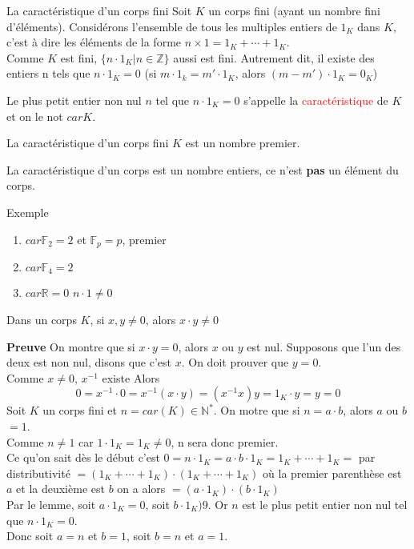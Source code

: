 \begin{parag}{La caractéristique d'un corps fini}
    Soit $K$ un corps fini (ayant un nombre fini d'éléments). Considérons l'ensemble de tous les multiples entiers de $1_K$ dans $K$, c'est à dire les éléments de la forme $n \times 1 = 1_K + \cdots + 1_K$.\\
    Comme $K$ est fini, $\{n\cdot 1_K| n \in \mathbb{Z}\}$ aussi est fini. Autrement dit, il existe des entiers n tels que $n \cdot 1_K = 0$ (si $m \cdot 1_k = m'\cdot 1_K$, alors $(m-m')\cdot 1_K = 0_K$)
    \begin{definition}
        Le plus petit entier non nul $n$ tel que $n\cdot 1_K = 0$ s'appelle la \textcolor{red}{caractéristique} de $K$ et on le not $carK$.
    \end{definition}
    \begin{theoreme}
        La caractéristique d'un corps fini $K$ est un nombre premier.
    \end{theoreme}
    \begin{framedremark}
        La caractéristique d'un corps est un nombre entiers, ce n'est \textbf{pas} un élément du corps.
    \end{framedremark}
    \begin{subparag}{Exemple}
        \begin{enumerate}
            \item $car\mathbb{F}_2 = 2$ et $\mathbb{F}_p = p$, premier
            \item $car\mathbb{F}_4 = 2$
            \item $car\mathbb{R} = 0$ $n\cdot1 \neq 0$
        \end{enumerate}
        \begin{lemme}
            Dans un corps $K$, si $x, y \neq 0$, alors $x\cdot y \neq 0$
        \end{lemme}
        \textbf{Preuve} On montre que si $x\cdot y = 0$, alors $x$ ou $y$ est nul. Supposons que l'un des deux est non nul, disons que c'est $x$. On doit prouver que $y = 0$.\\
        Comme $x \neq 0$, $x^{-1}$ existe Alors
        \[0 = x^{-1}\cdot 0 = x^{-1}(x\cdot y) = (x^{-1}x)y = 1_K\cdot y = y = 0\]
        Soit $K$ un corps fini et $n = car(K) \in \mathbb{N}^*$. On motre que si $n = a\cdot b$, alors $a$ ou $b$ $= 1$.
        \\
        Comme $n \neq 1$ car $1\cdot 1_K = 1_K \neq 0$, n sera donc premier.
        \\
        Ce qu'on sait dès le début c'est $0 = n\cdot 1_K = a\cdot b \cdot 1_K = 1_K + \cdots + 1_K = $ par distributivité $ = (1_K + \cdots + 1_K)\cdot (1_K + \cdots + 1_K)$ où la premier parenthèse est $a$ et la deuxième est $b$ on a alors $= (a\cdot 1_K)\cdot (b\cdot 1_K)$
        \\
        Par le lemme, soit $a\cdot 1_K = 0$, soit $b\cdot 1_K ) 9$. Or $n$ est le plus petit entier non nul tel que $n \cdot 1_K = 0$.
        \\
        Donc soit $a = n$ et $b = 1$, soit $b = n$ et $a = 1$.
    \end{subparag}
\end{parag}
